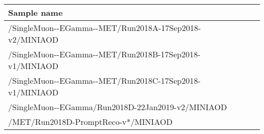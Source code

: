 \scriptsize
\begin{tabular}{lrr}
  \hline
  \textbf{Sample name} \\
  \hline
  \ttfamily /SingleMuon-{}-EGamma-{}-MET/Run2018A-17Sep2018-v2/MINIAOD \\
  \ttfamily /SingleMuon-{}-EGamma-{}-MET/Run2018B-17Sep2018-v1/MINIAOD \\
  \ttfamily /SingleMuon-{}-EGamma-{}-MET/Run2018C-17Sep2018-v1/MINIAOD \\
  \ttfamily /SingleMuon-{}-EGamma/Run2018D-22Jan2019-v2/MINIAOD \\
  \ttfamily /MET/Run2018D-PromptReco-v*/MINIAOD \\
  \hline
\end{tabular}
